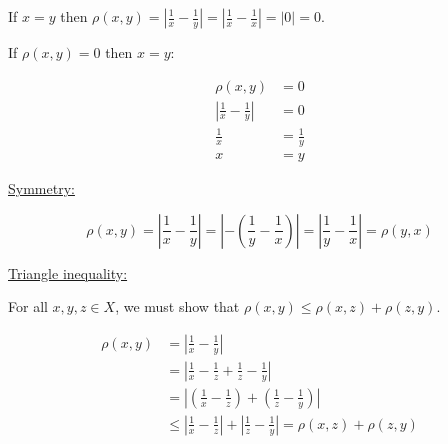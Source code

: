 \documentclass[]{article}
\begin{document}
				If $x = y$ then $\rho(x, y) = \left | \frac{1}{x} - \frac{1}{y} \right | = \left | \frac{1}{x} - \frac{1}{x} \right | = \left | 0 \right | = 0$. 

				If $\rho(x, y) = 0$ then $x = y$: 

				\begin{align*}
					\rho(x, y) &= 0 \\
					\left | \frac{1}{x} - \frac{1}{y} \right | &= 0 \\
					\frac{1}{x} &= \frac{1}{y} \\
					x &= y
				\end{align*}

			\underline{Symmetry:}

				\[\rho(x, y) = \left | \frac{1}{x} - \frac{1}{y}\right | = \left | - \left (\frac{1}{y} - \frac{1}{x} \right ) \right | = \left | \frac{1}{y} - \frac{1}{x} \right | = \rho(y, x)\]

			\underline{Triangle inequality:}

				For all $x, y, z \in X$, we must show that $\rho(x, y) \leq \rho(x, z) + \rho(z, y)$. 

				\begin{align*}
					\rho(x,y) &= \left | \frac{1}{x} - \frac{1}{y} \right | \\
					&= \left | \frac{1}{x} - \frac{1}{z} + \frac{1}{z} - \frac{1}{y} \right | \\
					&= \left | \left (\frac{1}{x} - \frac{1}{z}\right ) + \left (\frac{1}{z} - \frac{1}{y}\right ) \right | \\ 
					&\leq \left | \frac{1}{x} - \frac{1}{z} \right | + \left | \frac{1}{z} - \frac{1}{y} \right | = \rho(x, z) + \rho(z, y)
				\end{align*}
\end{document}
